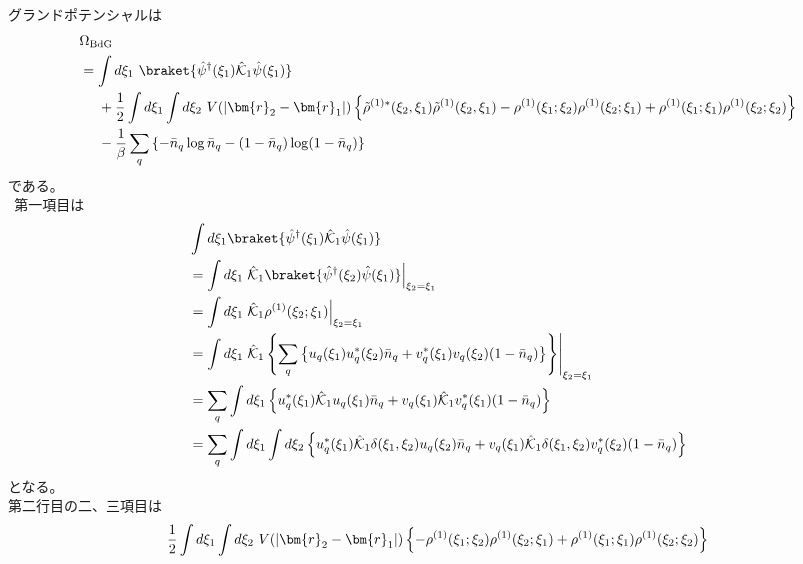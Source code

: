 \documentclass[dvipdfmx, 11pt, a4paper]{jsarticle}
\numberwithin{equation}{section}
\theoremstyle{definition}
\begin{document}
    \begin{derivationBox}
        グランドポテンシャルは
        \begin{align}
            &\Omega_{\mathrm{BdG}}\notag \\
            &=\int d\xi_1\ \braket{\hat{\psi}^\dagger(\xi_1) \hat{\mathcal{K}}_1 \hat{\psi}(\xi_1)} \notag \\
            &\ \ \ \ +\frac{1}{2}\int d\xi_1\int d\xi_2\ V(\left| \bm{r}_2-\bm{r}_1 \right|) \left\{ \tilde{\rho}^{(1)*}(\xi_2,\xi_1) \tilde{\rho}^{(1)}(\xi_2,\xi_1) - \rho^{(1)}(\xi_1;\xi_2) \rho^{(1)}(\xi_2;\xi_1) + \rho^{(1)}(\xi_1;\xi_1)\rho^{(1)}(\xi_2;\xi_2) \right\} \notag \\
            &\ \ \ \ - \frac{1}{\beta} \sum_q\left\{ -\bar{n}_q\log \bar{n}_q - (1-\bar{n}_q)\log(1-\bar{n}_q) \right\}
        \end{align}
        である。\\
        $\ \ $第一項目は
        \begin{align}
            &\int d\xi_1 \braket{\hat{\psi}^\dagger(\xi_1) \hat{\mathcal{K}}_1 \hat{\psi}(\xi_1)} \notag \\
            &= \int d\xi_1 \left. \hat{\mathcal{K}}_1\braket{\hat{\psi}^\dagger(\xi_2)  \hat{\psi}(\xi_1)} \right|_{\xi_2 = \xi_1} \notag \\
            &= \int d\xi_1 \left. \hat{\mathcal{K}}_1\rho^{(1)}(\xi_2;\xi_1) \right|_{\xi_2 = \xi_1} \notag \\
            &= \int d\xi_1 \left. \hat{\mathcal{K}}_1\left\{ \sum_q\left\{ u_q(\xi_1)u_q^*(\xi_2)\bar{n}_q+v_q^*(\xi_1)v_q(\xi_2)(1-\bar{n}_q) \right\}  \right\} \right|_{\xi_2 = \xi_1} \notag \\
            &= \sum_q\int d\xi_1  \left\{  u_q^*(\xi_1)\hat{\mathcal{K}}_1u_q(\xi_1)\bar{n}_q+v_q(\xi_1)\hat{\mathcal{K}}_1v_q^*(\xi_1)(1-\bar{n}_q) \right\} \notag \\
            &= \sum_q\int d\xi_1 \int d\xi_2 \left\{  u_q^*(\xi_1)\hat{\mathcal{K}}_1 \delta(\xi_1,\xi_2)u_q(\xi_2)\bar{n}_q+v_q(\xi_1)\hat{\mathcal{K}}_1\delta(\xi_1,\xi_2)v_q^*(\xi_2)(1-\bar{n}_q) \right\}   
        \end{align}
        となる。\\
        第二行目の二、三項目は
        \begin{align}
            &\frac{1}{2}\int d\xi_1\int d\xi_2\ V(\left| \bm{r}_2-\bm{r}_1 \right|) \left\{  - \rho^{(1)}(\xi_1;\xi_2) \rho^{(1)}(\xi_2;\xi_1) + \rho^{(1)}(\xi_1;\xi_1)\rho^{(1)}(\xi_2;\xi_2) \right\} \notag \\

\end{align}
\end{derivationBox}
\end{document}
